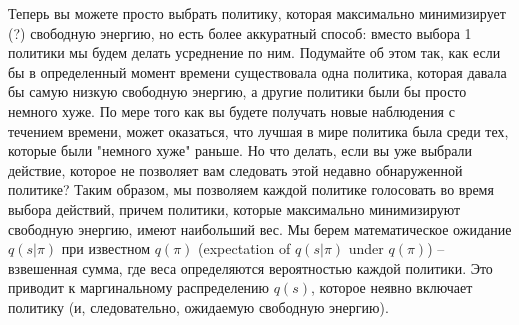 \documentclass[twoside,leqno, 11pt]{article}
\begin{document}
	
	Теперь вы можете просто выбрать политику, которая максимально минимизирует (?) свободную энергию, но есть более аккуратный способ: вместо выбора 1 политики мы будем делать усреднение по ним. Подумайте об этом так, как если бы в определенный момент времени существовала одна политика, которая давала бы самую низкую свободную энергию, а другие политики были бы просто немного хуже. По мере того как вы будете получать новые наблюдения с течением времени, может оказаться, что лучшая в мире политика была среди тех, которые были "немного хуже" раньше. Но что делать, если вы уже выбрали действие, которое не позволяет вам следовать этой недавно обнаруженной политике? Таким образом, мы позволяем каждой политике голосовать во время выбора действий, причем политики, которые максимально минимизируют свободную энергию, имеют наибольший вес. Мы берем математическое ожидание $q(s|\pi)$ при известном $q(\pi)$ (expectation of $q(s|\pi)$ under $q(\pi)$) -- взвешенная сумма, где веса определяются вероятностью каждой политики. Это приводит к маргинальному распределению $q(s)$, которое неявно включает политику (и, следовательно, ожидаемую свободную энергию).
	
	\begin{figure}[h]
	\end{figure}
	
\end{document}
